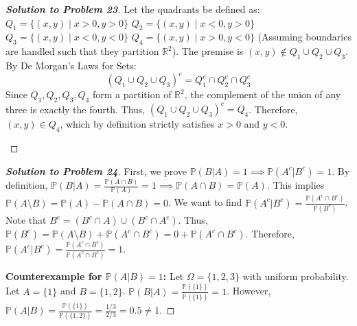\documentclass[11pt]{article}
\begin{document}
\begin{proof}[\textbf{Solution to Problem 23}]
Let the quadrants be defined as:
$Q_1 = \{(x,y) \mid x > 0, y > 0\}$
$Q_2 = \{(x,y) \mid x < 0, y > 0\}$
$Q_3 = \{(x,y) \mid x < 0, y < 0\}$
$Q_4 = \{(x,y) \mid x > 0, y < 0\}$
(Assuming boundaries are handled such that they partition $\mathbb{R}^2$).
The premise is $(x,y) \notin Q_1 \cup Q_2 \cup Q_3$. By De Morgan's Laws for Sets:
\[ (Q_1 \cup Q_2 \cup Q_3)^c = Q_1^c \cap Q_2^c \cap Q_3^c \]
Since $Q_1, Q_2, Q_3, Q_4$ form a partition of $\mathbb{R}^2$, the complement of the union of any three is exactly the fourth. Thus, $(Q_1 \cup Q_2 \cup Q_3)^c = Q_4$.
Therefore, $(x,y) \in Q_4$, which by definition strictly satisfies $x > 0$ and $y < 0$.

\begin{center}
\end{center}
\end{proof}

\begin{proof}[\textbf{Solution to Problem 24}]
First, we prove $\mathbb{P}(B|A) = 1 \implies \mathbb{P}(A^c|B^c) = 1$.
By definition, $\mathbb{P}(B|A) = \frac{\mathbb{P}(A \cap B)}{\mathbb{P}(A)} = 1 \implies \mathbb{P}(A \cap B) = \mathbb{P}(A)$.
This implies $\mathbb{P}(A \setminus B) = \mathbb{P}(A) - \mathbb{P}(A \cap B) = 0$.
We want to find $\mathbb{P}(A^c|B^c) = \frac{\mathbb{P}(A^c \cap B^c)}{\mathbb{P}(B^c)}$.
Note that $B^c = (B^c \cap A) \cup (B^c \cap A^c)$. Thus, $\mathbb{P}(B^c) = \mathbb{P}(A \setminus B) + \mathbb{P}(A^c \cap B^c) = 0 + \mathbb{P}(A^c \cap B^c)$.
Therefore, $\mathbb{P}(A^c|B^c) = \frac{\mathbb{P}(A^c \cap B^c)}{\mathbb{P}(A^c \cap B^c)} = 1$.

\textbf{Counterexample for $\mathbb{P}(A|B) = 1$:} Let $\Omega = \{1, 2, 3\}$ with uniform probability. Let $A = \{1\}$ and $B = \{1, 2\}$.
$\mathbb{P}(B|A) = \frac{\mathbb{P}(\{1\})}{\mathbb{P}(\{1\})} = 1$.
However, $\mathbb{P}(A|B) = \frac{\mathbb{P}(\{1\})}{\mathbb{P}(\{1, 2\})} = \frac{1/3}{2/3} = 0.5 \neq 1$.
\end{proof}
\end{document}

